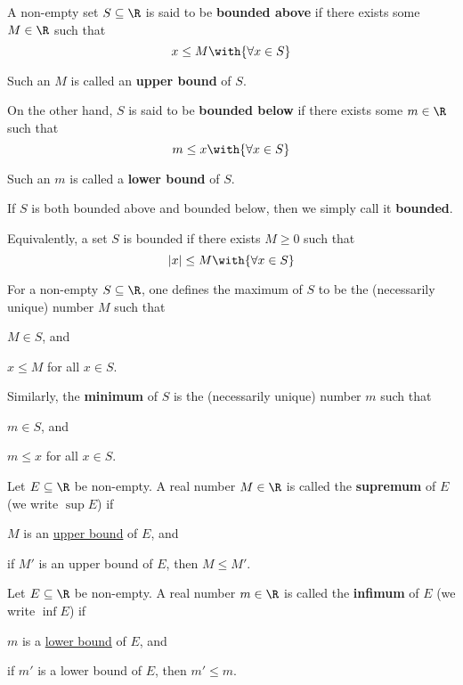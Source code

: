\label{e4698be}

A non-empty set $S\subseteq\R$ is said to be \textbf{bounded above} if there
exists some $M\in\R$ such that
$$
  x\leq M\with{\forall x\in S}
$$

Such an $M$ is called an \textbf{upper bound} of $S$.

On the other hand, $S$ is said to be \textbf{bounded below} if there exists
some $m\in\R$ such that
$$
  m\leq x\with{\forall x\in S}
$$

Such an $m$ is called a \textbf{lower bound} of $S$.

If $S$ is both bounded above and bounded below, then we simply call it
\textbf{bounded}.

Equivalently, a set $S$ is bounded if there exists $M\geq0$ such that
$$
  |x|\leq M\with{\forall x\in S}
$$

\label{c3ec51c}

For a non-empty $S\subseteq\R$, one defines the maximum of $S$ to be the
(necessarily unique) number $M$ such that
\begin{enumerati}
  \item $M\in S$, and
  \item $x\leq M$ for all $x\in S$.
\end{enumerati}

Similarly, the \textbf{minimum} of $S$ is the (necessarily unique) number $m$
such that
\begin{enumerati}
  \item $m\in S$, and
  \item $m\leq x$ for all $x\in S$.
\end{enumerati}

\label{e6981e1}

Let $E\subseteq\R$ be non-empty. A real number $M\in\R$ is called the
\textbf{supremum} of $E$ (we write $\sup E$) if
\begin{enumerati}
  \item $M$ is an \href{e4698be}{upper bound} of $E$, and
  \item if $M'$ is an upper bound of $E$, then $M\leq M'$.
\end{enumerati}

\label{ff16df6}

Let $E\subseteq\R$ be non-empty. A real number $m\in\R$ is called the
\textbf{infimum} of $E$ (we write $\inf E$) if
\begin{enumerati}
  \item $m$ is a \href{e4698be}{lower bound} of $E$, and
  \item if $m'$ is a lower bound of $E$, then $m'\leq m$.
\end{enumerati}

